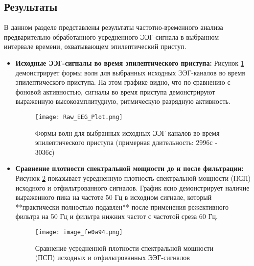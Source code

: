 \documentclass{article}
\providecommand{\pcsync}{\par\vspace{\baselineskip}} %
\begin{document}
\begin{paracol}{2}
\section{Результаты}
\pcsync

В данном разделе представлены результаты частотно-временного анализа предварительно обработанного усредненного ЭЭГ-сигнала в выбранном интервале времени, охватывающем эпилептический приступ.

\begin{itemize}
 \item \textbf{Исходные ЭЭГ-сигналы во время эпилептического приступа:}
 Рисунок \ref{fig:raw_eeg} демонстрирует формы волн для выбранных исходных ЭЭГ-каналов во время эпилептического приступа. На этом графике видно, что по сравнению с фоновой активностью, сигналы во время приступа демонстрируют выраженную высокоамплитудную, ритмическую разрядную активность.
\begin{figure}[H]
 \centering
 \texttt{[image: Raw\_EEG\_Plot.png]} %
 \caption{Формы волн для выбранных исходных ЭЭГ-каналов во время эпилептического приступа (примерная длительность: 2996с - 3036с)} %
 \label{fig:raw_eeg} %
\end{figure}

 \item \textbf{Сравнение плотности спектральной мощности до и после фильтрации:}
 Рисунок \ref{fig:psd} показывает усредненную плотность спектральной мощности (ПСП) исходного и отфильтрованного сигналов. График ясно демонстрирует наличие выраженного пика на частоте 50 Гц в исходном сигнале, который **практически полностью подавлен** после применения режективного фильтра на 50 Гц и фильтра нижних частот с частотой среза 60 Гц.
\begin{figure}[H]
 \centering
 \texttt{[image: image\_fe0a94.png]} %
 \caption{Сравнение усредненной плотности спектральной мощности (ПСП) исходных и отфильтрованных ЭЭГ-сигналов} %
 \label{fig:psd} %
\end{figure}


\end{itemize}
\end{paracol}
\end{document}
